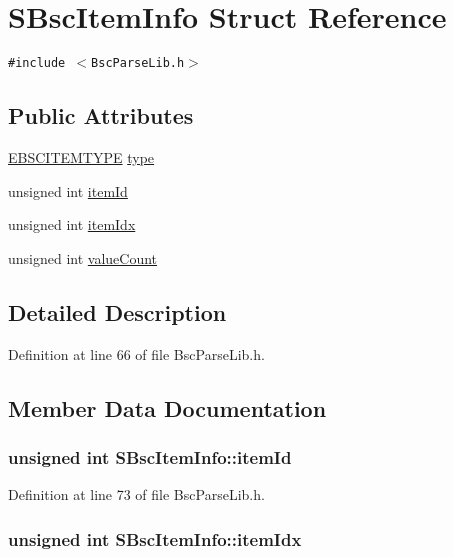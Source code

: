 \hypertarget{struct_s_bsc_item_info}{
\section{SBscItemInfo Struct Reference}
\label{struct_s_bsc_item_info}
}
{\tt \#include $<$BscParseLib.h$>$}

\subsection*{Public Attributes}
\begin{CompactItemize}
\item 
\hyperlink{_bsc_parse_lib_8h_7321d18d9bef2ff4ce8a9b26574f4a53}{EBSCITEMTYPE} \hyperlink{struct_s_bsc_item_info_f37833a5ec26eb203117371dc1dcaab9}{type}
\item 
unsigned int \hyperlink{struct_s_bsc_item_info_be4021c2f4a75da2b0924666191555e5}{itemId}
\item 
unsigned int \hyperlink{struct_s_bsc_item_info_3af8f2db520e75b6cb44a493c811b698}{itemIdx}
\item 
unsigned int \hyperlink{struct_s_bsc_item_info_1773cffcc05766b60089d45b59786eee}{valueCount}
\end{CompactItemize}


\subsection{Detailed Description}


Definition at line 66 of file BscParseLib.h.

\subsection{Member Data Documentation}
\hypertarget{struct_s_bsc_item_info_be4021c2f4a75da2b0924666191555e5}{
\subsubsection[{itemId}]{\setlength{\rightskip}{0pt plus 5cm}unsigned int {\bf SBscItemInfo::itemId}}}
\label{struct_s_bsc_item_info_be4021c2f4a75da2b0924666191555e5}




Definition at line 73 of file BscParseLib.h.\hypertarget{struct_s_bsc_item_info_3af8f2db520e75b6cb44a493c811b698}{
\subsubsection[{itemIdx}]{\setlength{\rightskip}{0pt plus 5cm}unsigned int {\bf SBscItemInfo::itemIdx}}}
\label{struct_s_bsc_item_info_3af8f2db520e75b6cb44a493c811b698}





